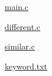 \href{../exp6/file/main.c.txt}{\underline{main.c}}

\href{../exp6/file/different.c.txt}{\underline{different.c}}

\href{../exp6/file/similar.c.txt}{\underline{similar.c}}

\href{../exp6/file/keyword.txt}{\underline{keyword.txt}}

